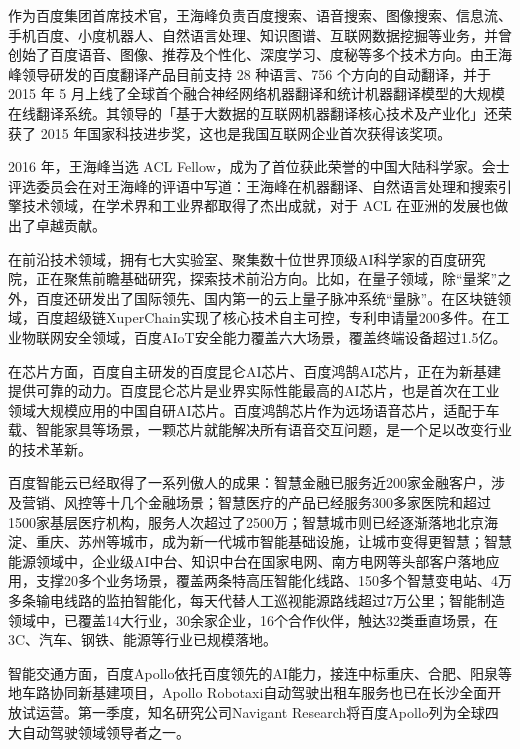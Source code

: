 \documentclass[letterpaper,10pt,english]{sphinxmanual}
\begin{document}
作为百度集团首席技术官，王海峰负责百度搜索、语音搜索、图像搜索、信息流、手机百度、小度机器人、自然语言处理、知识图谱、互联网数据挖掘等业务，并曾创始了百度语音、图像、推荐及个性化、深度学习、度秘等多个技术方向。由王海峰领导研发的百度翻译产品目前支持
28 种语言、756 个方向的自动翻译，并于 2015 年 5
月上线了全球首个融合神经网络机器翻译和统计机器翻译模型的大规模在线翻译系统。其领导的「基于大数据的互联网机器翻译核心技术及产业化」还荣获了
2015 年国家科技进步奖，这也是我国互联网企业首次获得该奖项。

2016 年，王海峰当选 ACL
Fellow，成为了首位获此荣誉的中国大陆科学家。会士评选委员会在对王海峰的评语中写道：王海峰在机器翻译、自然语言处理和搜索引擎技术领域，在学术界和工业界都取得了杰出成就，对于
ACL 在亚洲的发展也做出了卓越贡献。

在前沿技术领域，拥有七大实验室、聚集数十位世界顶级AI科学家的百度研究院，正在聚焦前瞻基础研究，探索技术前沿方向。比如，在量子领域，除“量桨”之外，百度还研发出了国际领先、国内第一的云上量子脉冲系统“量脉”。在区块链领域，百度超级链XuperChain实现了核心技术自主可控，专利申请量200多件。在工业物联网安全领域，百度AIoT安全能力覆盖六大场景，覆盖终端设备超过1.5亿。

在芯片方面，百度自主研发的百度昆仑AI芯片、百度鸿鹄AI芯片，正在为新基建提供可靠的动力。百度昆仑芯片是业界实际性能最高的AI芯片，也是首次在工业领域大规模应用的中国自研AI芯片。百度鸿鹄芯片作为远场语音芯片，适配于车载、智能家具等场景，一颗芯片就能解决所有语音交互问题，是一个足以改变行业的技术革新。

百度智能云已经取得了一系列傲人的成果：智慧金融已服务近200家金融客户，涉及营销、风控等十几个金融场景；智慧医疗的产品已经服务300多家医院和超过1500家基层医疗机构，服务人次超过了2500万；智慧城市则已经逐渐落地北京海淀、重庆、苏州等城市，成为新一代城市智能基础设施，让城市变得更智慧；智慧能源领域中，企业级AI中台、知识中台在国家电网、南方电网等头部客户落地应用，支撑20多个业务场景，覆盖两条特高压智能化线路、150多个智慧变电站、4万多条输电线路的监拍智能化，每天代替人工巡视能源路线超过7万公里；智能制造领域中，已覆盖14大行业，30余家企业，16个合作伙伴，触达32类垂直场景，在3C、汽车、钢铁、能源等行业已规模落地。

智能交通方面，百度Apollo依托百度领先的AI能力，接连中标重庆、合肥、阳泉等地车路协同新基建项目，Apollo
Robotaxi自动驾驶出租车服务也已在长沙全面开放试运营。第一季度，知名研究公司Navigant
Research将百度Apollo列为全球四大自动驾驶领域领导者之一。
%
\begin{footnote}[732]\sphinxAtStartFootnote
{}
%
\end{footnote}
\end{document}
